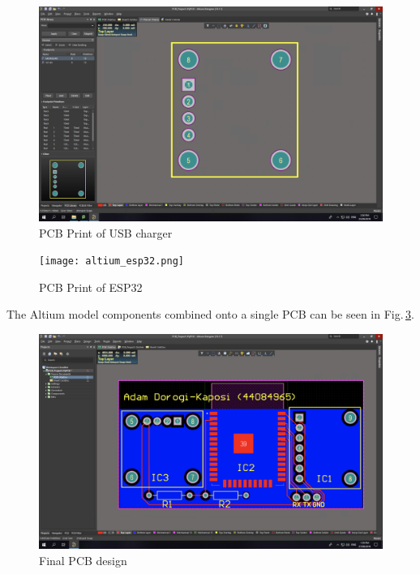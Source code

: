 \documentclass[12pt,openany,a4paper]{book}
\newcommand{\fig}[1]  {Fig.\,\ref{#1}}		%
\begin{document}
\begin{figure}[h]
\centering\includegraphics[width=\textwidth]{altium_usb_charger.png}
\caption{PCB Print of USB charger}
\label{fig:altium_usb_charger}
\end{figure}

\begin{figure}[h]
\centering\texttt{[image: altium\_esp32.png]}
\caption{PCB Print of ESP32}
\label{fig:altium_esp32}
\end{figure}

The Altium model components combined onto a single PCB can be seen in \fig{fig:altium_final}.


\begin{figure}[h]
\centering\includegraphics[width=\textwidth]{altium_final.png}
\caption{Final PCB design}
\label{fig:altium_final}
\end{figure}

\end{document}

